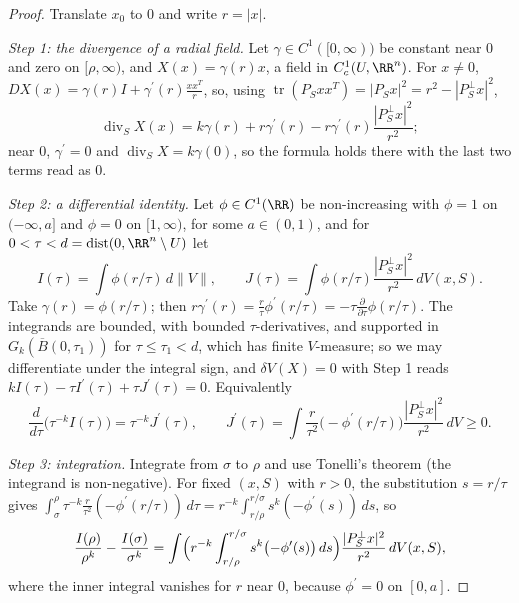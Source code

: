 \begin{proof}
Translate $x_0$ to $0$ and write $r = |x|$.

\emph{Step 1: the divergence of a radial field.} Let $\gamma \in C^1([0, \infty))$ be constant near $0$ and zero on $[\rho, \infty)$, and $X(x) = \gamma(r)x$, a field in $C^1_c(U, \RR^n)$. For $x \neq 0$,
$DX(x) = \gamma(r)I + \gamma^{\prime}(r)\frac{xx^T}r$, so, using $\operatorname{tr}(P_Sxx^T) = |P_Sx|^2 = r^2 - |P_S^\perp x|^2$,
\[
\operatorname{div}_SX(x) = k\gamma(r) + r\gamma^{\prime}(r) - r\gamma^{\prime}(r)\frac{|P_S^\perp x|^2}{r^2};
\]
near $0$, $\gamma^{\prime} = 0$ and $\operatorname{div}_SX = k\gamma(0)$, so the formula holds there with the last two terms read as $0$.

\emph{Step 2: a differential identity.} Let $\phi \in C^1(\RR)$ be non-increasing with $\phi = 1$ on $(-\infty, a]$ and $\phi = 0$ on $[1, \infty)$, for some $a \in (0, 1)$, and for
$0 < \tau < d = \operatorname{dist}(0, \RR^n \setminus U)$ let
\[
I(\tau) = \int\phi(r/\tau)\,d\|V\|, \qquad J(\tau) = \int\phi(r/\tau)\frac{|P_S^\perp x|^2}{r^2}\,dV(x, S) .
\]
Take $\gamma(r) = \phi(r/\tau)$; then $r\gamma^{\prime}(r) = \frac r\tau\phi^{\prime}(r/\tau) = -\tau\frac{\partial}{\partial\tau}\phi(r/\tau)$. The integrands are bounded, with bounded $\tau$-derivatives, and supported
in $G_k(\overline{B}(0, \tau_1))$ for $\tau \leq \tau_1 < d$, which has finite $V$-measure; so we may differentiate under the integral sign, and $\delta V(X) = 0$ with Step 1 reads
$kI(\tau) - \tau I^{\prime}(\tau) + \tau J^{\prime}(\tau) = 0$. Equivalently
\[
\frac{d}{d\tau}\bigl(\tau^{-k}I(\tau)\bigr) = \tau^{-k}J^{\prime}(\tau), \qquad J^{\prime}(\tau) = \int\frac r{\tau^2}\bigl(-\phi^{\prime}(r/\tau)\bigr)\frac{|P_S^\perp x|^2}{r^2}\,dV \geq 0 .
\]

\emph{Step 3: integration.} Integrate from $\sigma$ to $\rho$ and use Tonelli's theorem (the integrand is non-negative). For fixed $(x, S)$ with $r > 0$, the substitution $s = r/\tau$ gives
$\int_\sigma^\rho\tau^{-k}\frac r{\tau^2}(-\phi^{\prime}(r/\tau))\,d\tau = r^{-k}\int_{r/\rho}^{r/\sigma}s^k(-\phi^{\prime}(s))\,ds$, so
\begin{equation}\label{currents:equation-monotonicity-smooth}
\frac{I(\rho)}{\rho^k} - \frac{I(\sigma)}{\sigma^k} = \int\Bigl(r^{-k}\int_{r/\rho}^{r/\sigma}s^k\bigl(-\phi^{\prime}(s)\bigr)\,ds\Bigr)\frac{|P_S^\perp x|^2}{r^2}\,dV(x, S),
\end{equation}
where the inner integral vanishes for $r$ near $0$, because $\phi^{\prime} = 0$ on $[0, a]$.


\end{proof}
